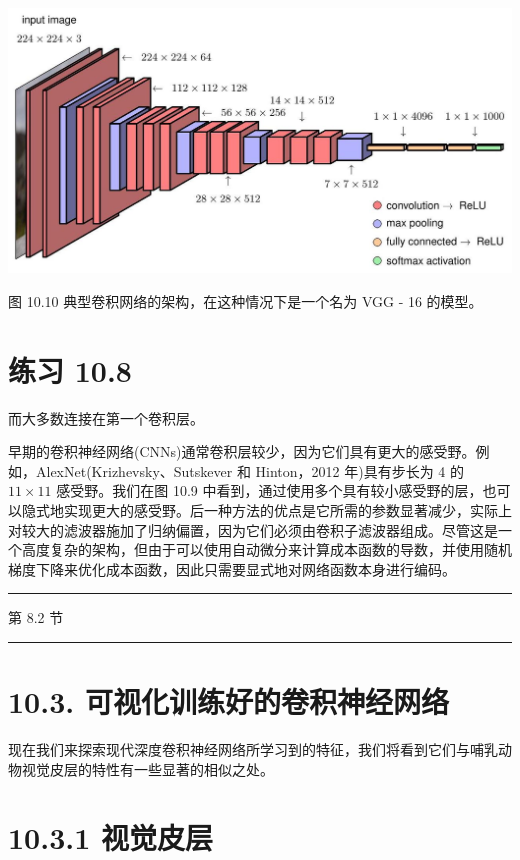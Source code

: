 \documentclass[10pt]{article}
\newcommand{\HRule}{\begin{center}\rule{0.9\linewidth}{0.2mm}\end{center}}
\begin{document}
\begin{center}
\includegraphics[max width=1.0\textwidth]{images/0194e279-9b28-703a-88f4-c3ac21e2010d_320_251_360_1294_682_0.jpg}
\end{center}
\hspace*{3em} 

图 10.10 典型卷积网络的架构，在这种情况下是一个名为 VGG - 16 的模型。

\section*{练习 10.8}

而大多数连接在第一个卷积层。

早期的卷积神经网络(CNNs)通常卷积层较少，因为它们具有更大的感受野。例如，AlexNet(Krizhevsky、Sutskever 和 Hinton，2012 年)具有步长为 4 的 \({11} \times  {11}\) 感受野。我们在图 10.9 中看到，通过使用多个具有较小感受野的层，也可以隐式地实现更大的感受野。后一种方法的优点是它所需的参数显著减少，实际上对较大的滤波器施加了归纳偏置，因为它们必须由卷积子滤波器组成。尽管这是一个高度复杂的架构，但由于可以使用自动微分来计算成本函数的导数，并使用随机梯度下降来优化成本函数，因此只需要显式地对网络函数本身进行编码。

\HRule

第 8.2 节

\HRule

\section*{10.3. 可视化训练好的卷积神经网络}

现在我们来探索现代深度卷积神经网络所学习到的特征，我们将看到它们与哺乳动物视觉皮层的特性有一些显著的相似之处。

\section*{10.3.1 视觉皮层}
\end{document}
